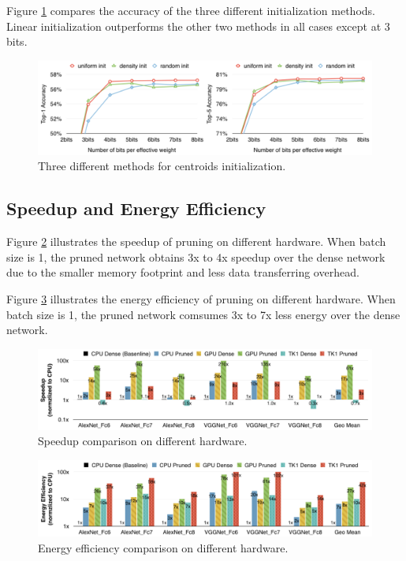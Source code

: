 \documentclass[12pt]{article}
\begin{document}
Figure \ref{fig:centroid_init_eval} compares the accuracy of the three different initialization methods. Linear initialization outperforms the other two methods in all cases except at 3 bits.

\begin{figure}
    \centering
    \includegraphics[width=0.9\linewidth]{images/f8_centroid_init_eval.png}
    \caption{Three different methods for centroids initialization.}
    \label{fig:centroid_init_eval}
\end{figure}

\subsection{Speedup and Energy Efficiency}

Figure \ref{fig:prune_speedup} illustrates the speedup of pruning on different hardware. When batch size is 1, the pruned network obtains 3x to 4x speedup over the dense network due to the smaller memory footprint and less data transferring overhead.

Figure \ref{fig:prune_energy} illustrates the energy efficiency of pruning on different hardware. When batch size is 1, the pruned network comsumes 3x to 7x less energy over the dense network.

\begin{figure}
    \centering
    \includegraphics[width=0.9\linewidth]{images/f9_prune_speedup.png}
    \caption{Speedup comparison on different hardware.}
    \label{fig:prune_speedup}
\end{figure}

\begin{figure}
    \centering
    \includegraphics[width=0.9\linewidth]{images/f10_prune_energy.png}
    \caption{Energy efficiency comparison on different hardware.}
    \label{fig:prune_energy}
\end{figure}
\end{document}
